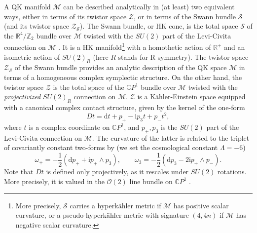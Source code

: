 \documentclass[12pt,reqno]{article}
\numberwithin{equation}{section}
\newcommand{\be}{\begin{equation}}
\newcommand{\ee}{\end{equation}}
\def\({\left(}
\def\){\right)}
\def\hf{\frac{1}{2}}
\newcommand{\CP}{\IC P^1}
\newcommand{\de}{\mathrm{d}}
\newcommand{\I}{\mathrm{i}}
\newcommand{\cS}{\mathcal{S}}
\newcommand{\cM}{\mathcal{M}}
\newcommand{\cO}{\mathcal{O}}
\newcommand{\cZ}{\mathcal{Z}}
\newcommand{\IR}{\mathbb{R}}
\newcommand{\IC}{\mathbb{C}}
\newcommand{\IZ}{\mathbb{Z}}
\newcommand{\kahler}{{K\"ahler}\xspace}
\newcommand{\hk}{{hyperk\"ahler}\xspace}
\def\varpiqk{t}
\numberwithin{equation}{section}
\begin{document}
A QK manifold $\cM$
 can be described analytically in (at least) two equivalent ways,
either in terms of  its
twistor space $\cZ$, or in terms of the Swann bundle $\cS$ (and its twistor space $\cZ_\cS$).
The Swann bundle, or HK cone, is
the total space $\cS$ of the $\IR^4/\IZ_2$ bundle over $\cM$ twisted with the $SU(2)$
part of the Levi-Civita connection on $\cM$ \cite{MR1096180,deWit:2001dj}.
It is a HK manifold\footnote{More precisely, $\cS$ carries a \hk metric if $\cM$
has positive scalar curvature, or a pseudo-\hk
metric with signature $(4,4n)$ if $\cM$ has negative scalar curvature.}
with a homothetic action of $\IR^+$ and an isometric
action of $SU(2)_R$ (here $R$ stands for R-symmetry).
The twistor space $\cZ_{\cS}$ of the Swann bundle
provides an analytic description of the  QK space $\cM$ in terms of a homogeneous
complex symplectic structure. On the other hand, the twistor space $\cZ$
is the total space  of the $\CP$ bundle over
$\cM$ twisted with the \emph{projectivized} $SU(2)_R$ connection on $\cM$.
$\cZ$ is a \kahler-Einstein space equipped with a canonical complex contact structure,
given by the kernel of the one-form
\be
\label{defDt}
D\varpiqk= \de \varpiqk+p_+ - \I p_3  \varpiqk+p_- \varpiqk^2,
\ee
where $\varpiqk$ is a complex coordinate on $\CP$, and $p_\pm,p_3$
is the $SU(2)$ part of the Levi-Civita connection on $\cM$. The curvature
of the latter is related to the triplet of covariantly constant two-forms by
(we set the cosmological constant $\Lambda=-6$)
\be
\label{ptoom}
\omega_+=-\hf\(\de p_+ + \I p_+\wedge p_3\) ,
\qquad
\omega_3=-\hf\(\de p_3-2\I p_+\wedge p_-\).
\ee
Note that $D\varpiqk$ is defined only projectively, as it rescales under $SU(2)$
rotations. More precisely, it is valued in the $\cO(2)$ line bundle on $\CP$ \cite{MR664330}.
\end{document}
